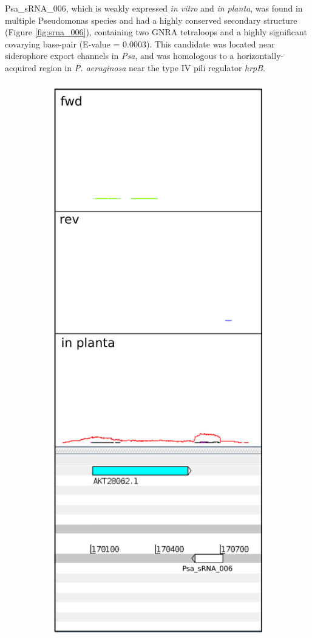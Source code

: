 Psa\_sRNA\_006, which is weakly expressed \textit{in vitro} and \textit{in planta}, was found in multiple Pseudomonas species and had a highly conserved secondary structure (Figure \ref{fig:srna_006}), containing two GNRA tetraloops and a highly significant covarying base-pair (E-value = 0.0003). This candidate was located near siderophore export channels in \textit{Psa}, and was homologous to a horizontally-acquired region in \textit{P. aeruginosa} near the type IV pili regulator \textit{hrpB}. 

\begin{figure}[H]
\begin{subfigure}{0.4\textwidth}
\includegraphics[scale=0.67]{psa/psa_ncRNA/psa_srna_006_exp.png} 

\end{subfigure}
\end{figure}
